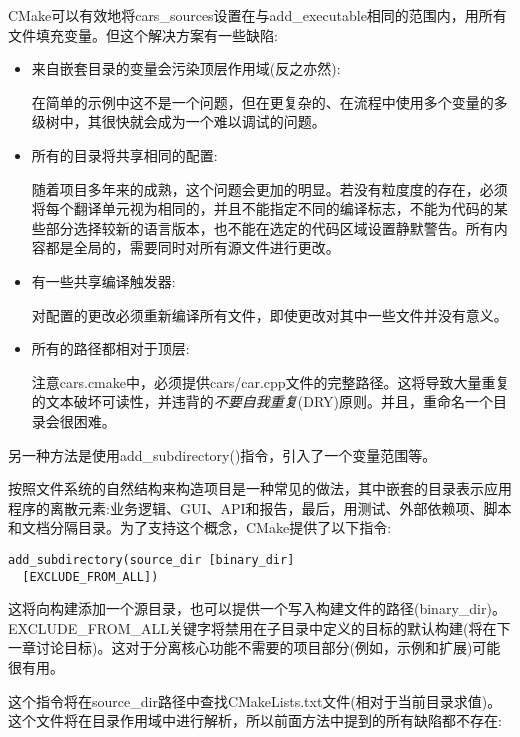 CMake可以有效地将cars\_sources设置在与add\_executable相同的范围内，用所有文件填充变量。但这个解决方案有一些缺陷:

\begin{itemize}
\item 
来自嵌套目录的变量会污染顶层作用域(反之亦然):

在简单的示例中这不是一个问题，但在更复杂的、在流程中使用多个变量的多级树中，其很快就会成为一个难以调试的问题。

\item 

所有的目录将共享相同的配置:

随着项目多年来的成熟，这个问题会更加的明显。若没有粒度度的存在，必须将每个翻译单元视为相同的，并且不能指定不同的编译标志，不能为代码的某些部分选择较新的语言版本，也不能在选定的代码区域设置静默警告。所有内容都是全局的，需要同时对所有源文件进行更改。

\item 
有一些共享编译触发器:

对配置的更改必须重新编译所有文件，即使更改对其中一些文件并没有意义。

\item 
所有的路径都相对于顶层:

注意cars.cmake中，必须提供cars/car.cpp文件的完整路径。这将导致大量重复的文本破坏可读性，并违背的\textit{不要自我重复}(DRY)原则。并且，重命名一个目录会很困难。
\end{itemize}

另一种方法是使用add\_subdirectory()指令，引入了一个变量范围等。


按照文件系统的自然结构来构造项目是一种常见的做法，其中嵌套的目录表示应用程序的离散元素:业务逻辑、GUI、API和报告，最后，用测试、外部依赖项、脚本和文档分隔目录。为了支持这个概念，CMake提供了以下指令:

\begin{lstlisting}[style=styleCMake]
add_subdirectory(source_dir [binary_dir]
  [EXCLUDE_FROM_ALL])
\end{lstlisting}

这将向构建添加一个源目录，也可以提供一个写入构建文件的路径(binary\_dir)。EXCLUDE\_FROM\_ALL关键字将禁用在子目录中定义的目标的默认构建(将在下一章讨论目标)。这对于分离核心功能不需要的项目部分(例如，示例和扩展)可能很有用。

这个指令将在source\_dir路径中查找CMakeLists.txt文件(相对于当前目录求值)。这个文件将在目录作用域中进行解析，所以前面方法中提到的所有缺陷都不存在:

